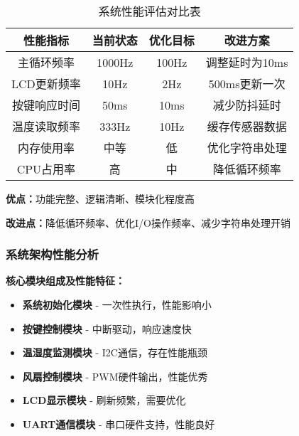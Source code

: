 \begin{table}[H]
  \centering
  \caption{系统性能评估对比表}
  \label{tab:performance_evaluation}
  \begin{tabular}{|c|c|c|c|}
    \hline
    \textbf{性能指标} & \textbf{当前状态} & \textbf{优化目标} & \textbf{改进方案} \\
    \hline
    主循环频率 & 1000Hz & 100Hz & 调整延时为10ms \\
    \hline
    LCD更新频率 & 10Hz & 2Hz & 500ms更新一次 \\
    \hline
    按键响应时间 & 50ms & 10ms & 减少防抖延时 \\
    \hline
    温度读取频率 & 333Hz & 10Hz & 缓存传感器数据 \\
    \hline
    内存使用率 & 中等 & 低 & 优化字符串处理 \\
    \hline
    CPU占用率 & 高 & 中 & 降低循环频率 \\
    \hline
  \end{tabular}
\end{table}

\textbf{优点：}功能完整、逻辑清晰、模块化程度高

\textbf{改进点：}降低循环频率、优化I/O操作频率、减少字符串处理开销

\subsubsection{系统架构性能分析}

\textbf{核心模块组成及性能特征：}

\begin{itemize}
    \vspace{-6pt}
  \item \textbf{系统初始化模块} - 一次性执行，性能影响小
    \vspace{-6pt}
  \item \textbf{按键控制模块} - 中断驱动，响应速度快
    \vspace{-6pt}
  \item \textbf{温湿度监测模块} - I2C通信，存在性能瓶颈
    \vspace{-6pt}
  \item \textbf{风扇控制模块} - PWM硬件输出，性能优秀
    \vspace{-6pt}
  \item \textbf{LCD显示模块} - 刷新频繁，需要优化
    \vspace{-6pt}
  \item \textbf{UART通信模块} - 串口硬件支持，性能良好
\end{itemize}
